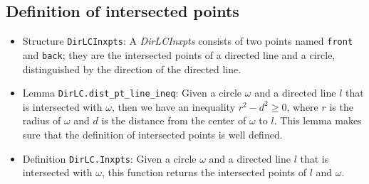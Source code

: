 \documentclass[12pt]{amsart}
\begin{document}
\subsection{Definition of intersected points}
\begin{itemize}
    \item Structure \verb|DirLCInxpts|: A \emph{DirLCInxpts} consists of two points named \verb|front| and \verb|back|; they are the intersected points of a directed line and a circle, distinguished by the direction of the directed line.
    \item Lemma \verb|DirLC.dist_pt_line_ineq|: Given a circle $\omega$ and a directed line $l$ that is intersected with $\omega$, then we have an inequality $r^2-d^2\ge0$, where $r$ is the radius of $\omega$ and $d$ is the distance from the center of $\omega$ to $l$. {\color{blue} This lemma makes sure that the definition of intersected points is well defined.}
    \item Definition \verb|DirLC.Inxpts|: Given a circle $\omega$ and a directed line $l$ that is intersected with $\omega$, this function returns the intersected points of $l$ and $\omega$.
\end{itemize}
\end{document}
